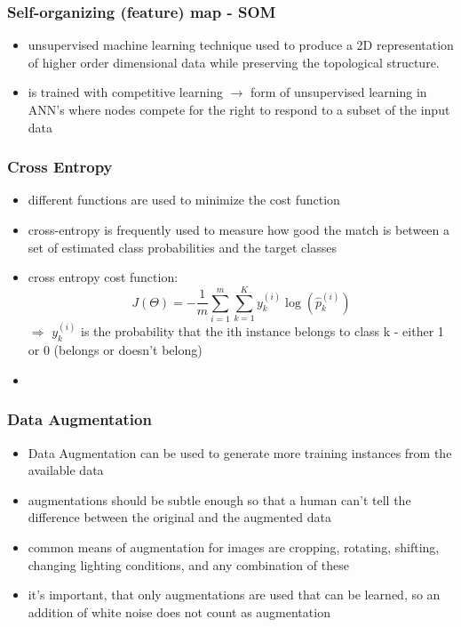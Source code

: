 \documentclass[12pt,a4paper]{article}
\begin{document}
\subsubsection{Self-organizing (feature) map - SOM} %
\label{ssub:self_organizing_}
\begin{itemize}
  \item unsupervised machine learning technique used to produce a 2D representation of higher order dimensional data while preserving the topological structure.
  \item is trained with competitive learning
  \newline \indent $\longrightarrow$ form of unsupervised learning in ANN's where nodes compete for the right to respond to a subset of the input data
\end{itemize}
\subsubsection{Cross Entropy} %
\label{ssub:cross_entropy}
\begin{itemize}
  \item different functions are used to minimize the cost function
  \item cross-entropy is frequently used to measure how good the match is between a set of estimated class probabilities and the target classes
  \item cross entropy cost function:
  \begin{equation}
    J(\Theta)  = - \frac{1}{m}\sum^m_{i=1} \sum^K_{k=1} y_k^{(i)}\log(\hat p_k^{(i)})
  \end{equation}
  $\Longrightarrow$ $y_k^{(i)}$ is the probability that the ith instance belongs to class k - either 1 or 0 (belongs or doesn't belong)
  \item 
\end{itemize}
\subsubsection{Data Augmentation} %
\label{ssub:data_augmentation}
\begin{itemize}
  \item Data Augmentation can be used to generate more training instances from the available data
  \item augmentations should be subtle enough so that a human can't tell the difference between the original and the augmented data
  \item common means of augmentation for images are cropping, rotating, shifting, changing lighting conditions, and any combination of these
  \item it's important, that only augmentations are used that can be learned, so an addition of white noise does not count as augmentation
\end{itemize}
\end{document}
